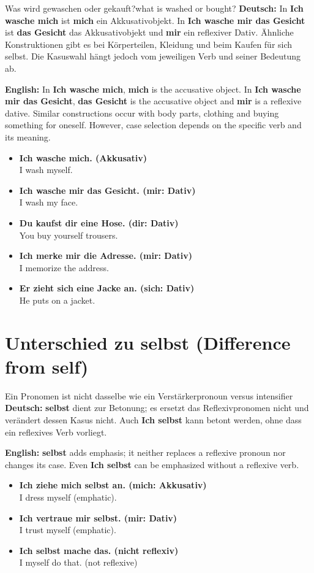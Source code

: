 \documentclass[a4paper,11pt]{article}
\newcommand{\GermanText}[1]{\textbf{Deutsch: }#1\par}
\newcommand{\EnglishText}[1]{{\small\color{SoftGray}\textbf{English: }#1\par}}
\newcommand{\ExampleItem}[2]{\item \textbf{#1}\\{\small\color{SoftGray}#2}}
\begin{document}
    \begin{grammarentry}{Was wird gewaschen oder gekauft?}{what is washed or bought?}
        \GermanText{In \textbf{Ich wasche mich} ist \textbf{mich} ein Akkusativobjekt. In \textbf{Ich wasche mir das Gesicht} ist \textbf{das Gesicht} das Akkusativobjekt und \textbf{mir} ein reflexiver Dativ. Ähnliche Konstruktionen gibt es bei Körperteilen, Kleidung und beim Kaufen für sich selbst. Die Kasuswahl hängt jedoch vom jeweiligen Verb und seiner Bedeutung ab.}
        \EnglishText{In \textbf{Ich wasche mich}, \textbf{mich} is the accusative object. In \textbf{Ich wasche mir das Gesicht}, \textbf{das Gesicht} is the accusative object and \textbf{mir} is a reflexive dative. Similar constructions occur with body parts, clothing and buying something for oneself. However, case selection depends on the specific verb and its meaning.}
        \begin{exbox}
            \begin{itemize}
                \ExampleItem{Ich wasche mich. (Akkusativ)}{I wash myself.}
                \ExampleItem{Ich wasche mir das Gesicht. (mir: Dativ)}{I wash my face.}
                \ExampleItem{Du kaufst dir eine Hose. (dir: Dativ)}{You buy yourself trousers.}
                \ExampleItem{Ich merke mir die Adresse. (mir: Dativ)}{I memorize the address.}
                \ExampleItem{Er zieht sich eine Jacke an. (sich: Dativ)}{He puts on a jacket.}
            \end{itemize}
        \end{exbox}
    \end{grammarentry}

\section{Unterschied zu \glqq selbst\grqq{} (Difference from self)}

    \begin{grammarentry}{Ein Pronomen ist nicht dasselbe wie ein Verstärker}{pronoun versus intensifier}
        \GermanText{\textbf{selbst} dient zur Betonung; es ersetzt das Reflexivpronomen nicht und verändert dessen Kasus nicht. Auch \textbf{Ich selbst} kann betont werden, ohne dass ein reflexives Verb vorliegt.}
        \EnglishText{\textbf{selbst} adds emphasis; it neither replaces a reflexive pronoun nor changes its case. Even \textbf{Ich selbst} can be emphasized without a reflexive verb.}
        \begin{exbox}
            \begin{itemize}
                \ExampleItem{Ich ziehe mich selbst an. (mich: Akkusativ)}{I dress myself (emphatic).}
                \ExampleItem{Ich vertraue mir selbst. (mir: Dativ)}{I trust myself (emphatic).}
                \ExampleItem{Ich selbst mache das. (nicht reflexiv)}{I myself do that. (not reflexive)}
            \end{itemize}
        \end{exbox}
    \end{grammarentry}
\end{document}
